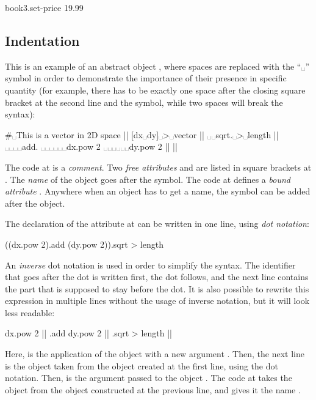 \begin{ffcode}
book3.set-price 19.99
\end{ffcode}

\subsection{Indentation}

This is an example of an abstract object , where
spaces are replaced with the ``␣'' symbol in order to demonstrate
the importance of their presence in specific quantity
(for example, there has to be exactly one space after the closing square bracket at the
second line and the \ff{>} symbol, while two spaces will break the syntax):

\begin{ffcode}
#␣This is a vector in 2D space |$\label{ln:comment}$|
[dx␣dy]␣>␣vector |$\label{ln:vector}$|
␣␣sqrt.␣>␣length |$\label{ln:length}$|
␣␣␣␣add.
␣␣␣␣␣␣dx.pow 2
␣␣␣␣␣␣dy.pow 2 |$\label{ln:length-end}$| |$\label{ln:vector-end}$|
\end{ffcode}

The code at  is a \emph{comment}.
Two \emph{free attributes}  and 
are listed in square brackets at .
The \emph{name} of the object goes after the \ff{>} symbol.
The code at  defines
a \emph{bound attribute} . Anywhere when an object
has to get a name, the \ff{>} symbol can be added after the object.

The declaration of the attribute  at 
can be written in one line, using \emph{dot notation}:

\begin{ffcode}
((dx.pow 2).add (dy.pow 2)).sqrt > length
\end{ffcode}

An \emph{inverse} dot notation is used in order to simplify
the syntax. The identifier that goes after the dot is written
first, the dot follows, and the next line contains the part
that is supposed to stay before the dot. It is also possible to rewrite
this expression in multiple lines without the usage of
inverse notation, but it will look less readable:

\begin{ffcode}
dx.pow 2 |$\label{ln:dx-pow}$|
.add
  dy.pow 2 |$\label{ln:dx-pow-2}$|
.sqrt > length |$\label{ln:dx-pow-3}$|
\end{ffcode}

Here,  is the application of the object  with
a new argument . Then, the next line is the object  taken
from the object created at the first line, using the dot notation. Then,
 is the argument passed to the object .
The code at  takes the object  from the object constructed
at the previous line, and gives it the name .

